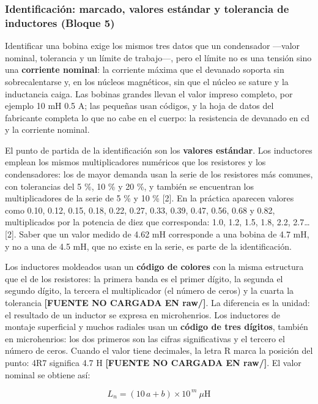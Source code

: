 \documentclass[11pt,letterpaper]{article}
\begin{document}
\subsubsection{Identificación: marcado, valores estándar y tolerancia de inductores (Bloque 5)}

Identificar una bobina exige los mismos tres datos que un condensador ---valor nominal, tolerancia y un límite de trabajo---, pero el límite no es una tensión sino una \textbf{corriente nominal}: la corriente máxima que el devanado soporta sin sobrecalentarse y, en los núcleos magnéticos, sin que el núcleo se sature y la inductancia caiga. Las bobinas grandes llevan el valor impreso completo, por ejemplo \guillemotleft{}10 mH 0.5 A\guillemotright{}; las pequeñas usan códigos, y la hoja de datos del fabricante completa lo que no cabe en el cuerpo: la resistencia de devanado en cd y la corriente nominal.

El punto de partida de la identificación son los \textbf{valores estándar}. Los inductores emplean los mismos multiplicadores numéricos que los resistores y los condensadores: los de mayor demanda usan la serie de los resistores más comunes, con tolerancias del 5 \%, 10 \% y 20 \%, y también se encuentran los multiplicadores de la serie de 5 \% y 10 \% [2]. En la práctica aparecen valores como 0.10, 0.12, 0.15, 0.18, 0.22, 0.27, 0.33, 0.39, 0.47, 0.56, 0.68 y 0.82, multiplicados por la potencia de diez que corresponda: 1.0, 1.2, 1.5, 1.8, 2.2, 2.7\ldots{} [2]. Saber que un valor medido de 4.62 mH corresponde a una bobina de 4.7 mH, y no a una de 4.5 mH, que no existe en la serie, es parte de la identificación.

Los inductores moldeados usan un \textbf{código de colores} con la misma estructura que el de los resistores: la primera banda es el primer dígito, la segunda el segundo dígito, la tercera el multiplicador (el número de ceros) y la cuarta la tolerancia \textcolor{iuborange}{\textbf{[FUENTE NO CARGADA EN raw/]}}. La diferencia es la unidad: el resultado de un inductor se expresa en microhenrios. Los inductores de montaje superficial y muchos radiales usan un \textbf{código de tres dígitos}, también en microhenrios: los dos primeros son las cifras significativas y el tercero el número de ceros. Cuando el valor tiene decimales, la letra R marca la posición del punto: 4R7 significa 4.7 \textmu{}H \textcolor{iuborange}{\textbf{[FUENTE NO CARGADA EN raw/]}}. El valor nominal se obtiene así:

\begin{equation}
  L_{n} = (10\,a + b) \times 10^{\,m}\ \mu\text{H}
\end{equation}
\end{document}
